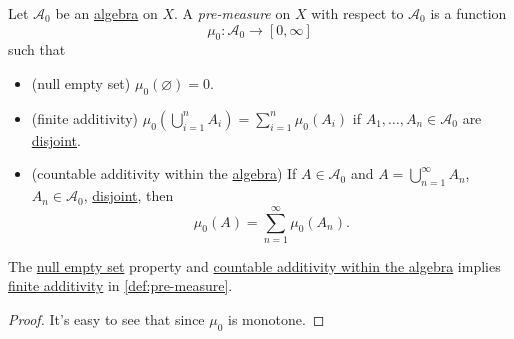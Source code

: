 \begin{definition}\label{def:pre-measure}
	Let \(\mathcal{A} _0\) be an \hyperref[def:algebra]{algebra} on \(X\). A \emph{pre-measure} on \(X\) with respect to \(\mathcal{A} _0\) is a function
	\[
		\mu_0 \colon \mathcal{A} _0\to [0, \infty ]
	\]
	such that
	\begin{itemize}
		\item\label{def:pre-measure-null-empty-set}(null empty set) \(\mu_0(\varnothing ) = 0\).
		\item\label{def:pre-measure-finite-additivity}(finite additivity) \(\mu_0\left(\bigcup_{i=1}^{n} A_{i}\right) = \sum_{i=1}^{n} \mu_0(A_{i})\) if
		      \(A_1, \dots , A_n\in \mathcal{A} _0 \) are \underline{disjoint}.
		\item\label{def:pre-measure-countable-additivity-within-the-algebra}(countable additivity within the \hyperref[def:algebra]{algebra}) If \(A\in\mathcal{A} _0\) and \(A = \bigcup_{n=1}^{\infty} A_{n}\), \(A_n\in\mathcal{A} _0\), \underline{disjoint}, then
		      \[
			      \mu_0(A) = \sum_{n=1}^{\infty} \mu_0(A_{n}).
		      \]
	\end{itemize}
\end{definition}

\begin{lemma}
	The \hyperref[def:pre-measure-null-empty-set]{null empty set} property and \hyperref[def:pre-measure-countable-additivity-within-the-algebra]{countable additivity within the \hyperref[def:algebra]{algebra}} implies \hyperref[def:pre-measure-finite-additivity]{finite additivity} in \autoref{def:pre-measure}.
\end{lemma}
\begin{proof}
	It's easy to see that since \(\mu _0\) is monotone.
\end{proof}

